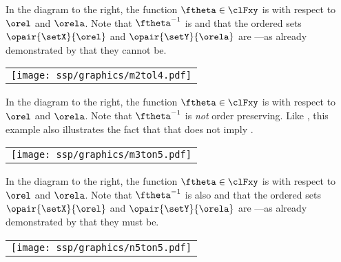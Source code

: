 \begin{minipage}{\tw-40mm}%
\begin{example}
\footnotemark
\label{ex:order_M2_L4}
In the diagram to the right, the function $\ftheta\in\clFxy$ 
is  with respect to $\orel$ and $\orela$.
Note that $\ftheta^{-1}$ is  and that
the ordered sets $\opair{\setX}{\orel}$ and $\opair{\setY}{\orela}$ are ---as already demonstrated 
by  that they cannot be.
\end{example}
\end{minipage}%
%
\hfill%
\begin{tabular}{c}
  \texttt{[image: ssp/graphics/m2tol4.pdf]}%
\end{tabular}

\begin{minipage}{\tw-40mm}%
\begin{example}
\label{ex:order_M3_N5}
In the diagram to the right, the function $\ftheta\in\clFxy$ 
is  with respect to $\orel$ and $\orela$.
Note that $\ftheta^{-1}$ is \emph{not} order preserving.
Like ,
this example also illustrates the fact that 
that  does not imply .
\end{example}
\end{minipage}%
\hfill%
\begin{tabular}{c}
  \texttt{[image: ssp/graphics/m3ton5.pdf]}%
\end{tabular}

\begin{minipage}{\tw-40mm}%
\begin{example}
\label{ex:order_N5_N5}
In the diagram to the right, the function $\ftheta\in\clFxy$ 
is  with respect to $\orel$ and $\orela$.
Note that $\ftheta^{-1}$ is also  and that
the ordered sets $\opair{\setX}{\orel}$ and $\opair{\setY}{\orela}$
are ---as already demonstrated 
by  that they must be.
\end{example}
\end{minipage}%
\hfill%
\begin{tabular}{c}
  \texttt{[image: ssp/graphics/n5ton5.pdf]}%
\end{tabular}

